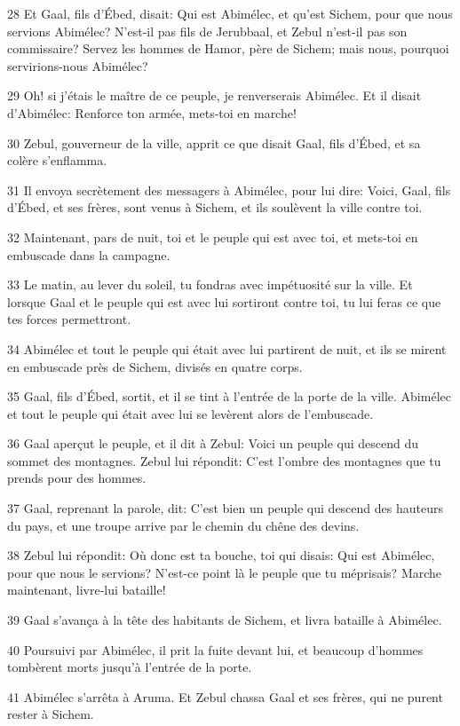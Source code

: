 \par 28 Et Gaal, fils d'Ébed, disait: Qui est Abimélec, et qu'est Sichem, pour que nous servions Abimélec? N'est-il pas fils de Jerubbaal, et Zebul n'est-il pas son commissaire? Servez les hommes de Hamor, père de Sichem; mais nous, pourquoi servirions-nous Abimélec?
\par 29 Oh! si j'étais le maître de ce peuple, je renverserais Abimélec. Et il disait d'Abimélec: Renforce ton armée, mets-toi en marche!
\par 30 Zebul, gouverneur de la ville, apprit ce que disait Gaal, fils d'Ébed, et sa colère s'enflamma.
\par 31 Il envoya secrètement des messagers à Abimélec, pour lui dire: Voici, Gaal, fils d'Ébed, et ses frères, sont venus à Sichem, et ils soulèvent la ville contre toi.
\par 32 Maintenant, pars de nuit, toi et le peuple qui est avec toi, et mets-toi en embuscade dans la campagne.
\par 33 Le matin, au lever du soleil, tu fondras avec impétuosité sur la ville. Et lorsque Gaal et le peuple qui est avec lui sortiront contre toi, tu lui feras ce que tes forces permettront.
\par 34 Abimélec et tout le peuple qui était avec lui partirent de nuit, et ils se mirent en embuscade près de Sichem, divisés en quatre corps.
\par 35 Gaal, fils d'Ébed, sortit, et il se tint à l'entrée de la porte de la ville. Abimélec et tout le peuple qui était avec lui se levèrent alors de l'embuscade.
\par 36 Gaal aperçut le peuple, et il dit à Zebul: Voici un peuple qui descend du sommet des montagnes. Zebul lui répondit: C'est l'ombre des montagnes que tu prends pour des hommes.
\par 37 Gaal, reprenant la parole, dit: C'est bien un peuple qui descend des hauteurs du pays, et une troupe arrive par le chemin du chêne des devins.
\par 38 Zebul lui répondit: Où donc est ta bouche, toi qui disais: Qui est Abimélec, pour que nous le servions? N'est-ce point là le peuple que tu méprisais? Marche maintenant, livre-lui bataille!
\par 39 Gaal s'avança à la tête des habitants de Sichem, et livra bataille à Abimélec.
\par 40 Poursuivi par Abimélec, il prit la fuite devant lui, et beaucoup d'hommes tombèrent morts jusqu'à l'entrée de la porte.
\par 41 Abimélec s'arrêta à Aruma. Et Zebul chassa Gaal et ses frères, qui ne purent rester à Sichem.
